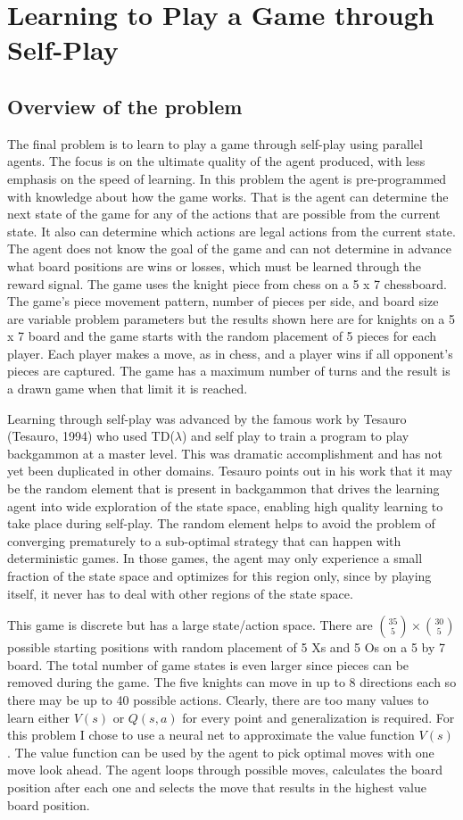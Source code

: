 \section{Learning to Play a Game through Self-Play}
\subsection{Overview of the problem}
The final problem is to learn to play a game through self-play using parallel agents.  The focus is on the ultimate quality of the agent produced, with less emphasis on the speed of learning.  In this problem the agent is pre-programmed with knowledge about how the game works.  That is the agent can determine the next state of the game for any of the actions that are possible from the current state.  It also can determine which actions are legal actions from the current state.  The agent does not know the goal of the game and can not determine in advance what board positions are wins or losses, which must be learned through the reward signal.  The game uses the knight piece from chess on a 5 x 7 chessboard.  The game’s piece movement pattern, number of pieces per side, and board size are variable problem parameters but the results shown here are for knights on a 5 x 7 board and the game starts with the random placement of 5 pieces for each player.  Each player makes a move, as in chess, and a player wins if all opponent’s pieces are captured.  The game has a maximum number of turns and the result is a drawn game when that limit it is reached.

Learning through self-play was advanced by the famous work by Tesauro (Tesauro, 1994) who used TD($\lambda$) and self play to train a program to play backgammon at a master level.  This was dramatic accomplishment and has not yet been duplicated in other domains.  Tesauro points out in his work that it may be the random element that is present in backgammon that drives the learning agent into wide exploration of the state space, enabling high quality learning to take place during self-play.  The random element helps to avoid the problem of converging prematurely to a sub-optimal strategy that can happen with deterministic games.  In those games, the agent may only experience a small fraction of the state space and optimizes for this region only, since by playing itself, it never has to deal with other regions of the state space.

This game is discrete but has a large state/action space.  There are ${35 \choose 5} \times {30 \choose 5}$ possible starting positions with random placement of 5 Xs and 5 Os on a 5 by 7 board.  The total number of game states is even larger since pieces can be removed during the game.  The five knights can move in up to 8 directions each so there may be up to 40 possible actions.  Clearly, there are too many values to learn either $V(s)$ or $Q(s,a)$ for every point and generalization is required.  For this problem I chose to use a neural net to approximate the value function $V(s)$.  The value function can be used by the agent to pick optimal moves with one move look ahead.  The agent loops through possible moves, calculates the board position after each one and selects the move that results in the highest value board position.

